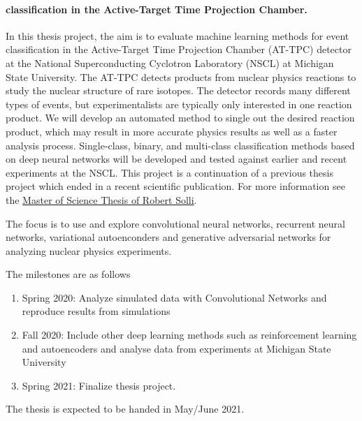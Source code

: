 \documentclass[%
oneside,                 %
final,                   %
10pt]{article}
\begin{document}
\paragraph{classification in the Active-Target Time Projection Chamber.}
In this thesis project, the aim is to evaluate machine learning methods for
event classification in the Active-Target Time Projection Chamber
(AT-TPC) detector at the National Superconducting Cyclotron Laboratory
(NSCL) at Michigan State University. The AT-TPC detects products from
nuclear physics reactions to study the nuclear structure of rare
isotopes. The detector records many different types of events, but
experimentalists are typically only interested in one reaction
product. We will develop an automated method to single out the desired
reaction product, which may result in more accurate physics results as
well as a faster analysis process. Single-class, binary, and
multi-class classification methods based on deep neural networks will
be developed and tested against earlier and recent experiments at the
NSCL.  This project is a continuation of a previous thesis project which ended in a recent scientific publication.
For more information see the \href{{https://github.com/copperwire/thesis/blob/master/main.pdf}}{Master of Science Thesis of Robert Solli}.


The focus is to  use and explore convolutional neural networks, recurrent neural networks, variational
autoenconders and generative adversarial networks for analyzing nuclear physics experiments.



The milestones are as follows

\begin{enumerate}
\item Spring 2020: Analyze simulated data with Convolutional Networks and reproduce results from simulations

\item Fall 2020: Include other deep learning methods such as reinforcement learning and autoencoders and analyse data from experiments at Michigan State University

\item Spring 2021: Finalize thesis project.
\end{enumerate}

\noindent
The thesis is expected to be handed in May/June  2021.





































\end{document}
